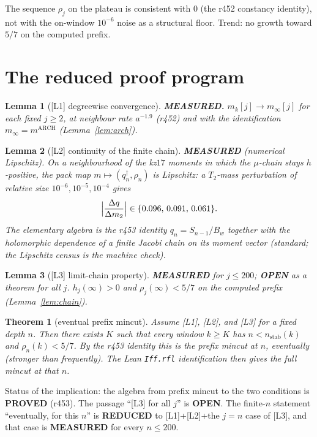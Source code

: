 \documentclass[11pt]{article}
\newtheorem{lemma}{Lemma}
\newtheorem{thm}{Theorem}
\begin{document}
The sequence $\rho_j$ on the plateau is
consistent with $0$ (the r452
constancy identity), not with the
on-window $10^{-6}$ noise as a
structural floor.
Trend: no growth toward $5/7$ on the
computed prefix.

\section{The reduced proof program}\label{sec:C}

\begin{lemma}[{[L1] degreewise convergence}]\label{lem:L1}
\textbf{MEASURED.}
$m_k[j]\to m_\infty[j]$ for each fixed
$j\ge 2$, at neighbour rate $a^{-1.9}$
(r452) and with the identification
$m_\infty=m^{\mathrm{ARCH}}$
(Lemma~\ref{lem:arch}).
\end{lemma}

\begin{lemma}[{[L2] continuity of the finite chain}]\label{lem:L2}
\textbf{MEASURED} (numerical Lipschitz).
On a neighbourhood of the kz$17$ moments
in which the $\mu$-chain stays
$h$-positive, the pack map
$m\mapsto(q_n^\dagger,\rho_n)$ is Lipschitz:
a $T_2$-mass perturbation of relative
size $10^{-6},10^{-5},10^{-4}$ gives
\[
\Bigl|\frac{\Delta q}{\Delta m_2}\Bigr|
\in\{0.096,\,0.091,\,0.061\}.
\]
The elementary algebra is the r453
identity $q_n=S_{n-1}/B_w$ together
with the holomorphic dependence of a
finite Jacobi chain on its moment
vector (standard; the Lipschitz
census is the machine check).
\end{lemma}

\begin{lemma}[{[L3] limit-chain property}]\label{lem:L3}
\textbf{MEASURED} for $j\le 200$;
\textbf{OPEN} as a theorem for all $j$.
$h_j(\infty)>0$ and
$\rho_j(\infty)<5/7$ on the computed
prefix (Lemma~\ref{lem:chain}).
\end{lemma}

\begin{thm}[eventual prefix mincut]\label{thm:eventual}
Assume [L1], [L2], and [L3] for a fixed
depth $n$.
Then there exists $K$ such that every
window $k\ge K$ has $n<n_{\mathrm{stab}}(k)$
and $\rho_n(k)<5/7$.
By the r453 identity this is the prefix
mincut at $n$, \emph{eventually}
(stronger than frequently).
The Lean \texttt{Iff.rfl} identification
then gives the full mincut at that $n$.
\end{thm}

Status of the implication: the algebra
from prefix mincut to the two
conditions is \textbf{PROVED} (r453).
The passage ``[L3] for all $j$'' is
\textbf{OPEN}.
The finite-$n$ statement
``eventually, for this $n$'' is
\textbf{REDUCED} to [L1]+[L2]+the
$j=n$ case of [L3], and that case is
\textbf{MEASURED} for every
$n\le 200$.
\end{document}
